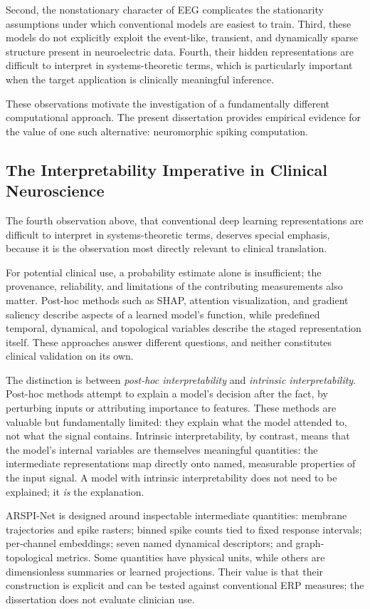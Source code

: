 Second, the nonstationary character of EEG complicates the stationarity assumptions under which conventional models are easiest to train. Third, these models do not explicitly exploit the event-like, transient, and dynamically sparse structure present in neuroelectric data. Fourth, their hidden representations are difficult to interpret in systems-theoretic terms, which is particularly important when the target application is clinically meaningful inference.

These observations motivate the investigation of a fundamentally different computational approach. The present dissertation provides empirical evidence for the value of one such alternative: neuromorphic spiking computation.

\subsection{The Interpretability Imperative in Clinical Neuroscience}

The fourth observation above, that conventional deep learning representations are difficult to interpret in systems-theoretic terms, deserves special emphasis, because it is the observation most directly relevant to clinical translation.

For potential clinical use, a probability estimate alone is insufficient; the provenance, reliability, and limitations of the contributing measurements also matter. Post-hoc methods such as SHAP, attention visualization, and gradient saliency describe aspects of a learned model's function, while predefined temporal, dynamical, and topological variables describe the staged representation itself. These approaches answer different questions, and neither constitutes clinical validation on its own.

The distinction is between \emph{post-hoc interpretability} and \emph{intrinsic interpretability}. Post-hoc methods attempt to explain a model's decision after the fact, by perturbing inputs or attributing importance to features. These methods are valuable but fundamentally limited: they explain what the model attended to, not what the signal contains. Intrinsic interpretability, by contrast, means that the model's internal variables are themselves meaningful quantities: the intermediate representations map directly onto named, measurable properties of the input signal. A model with intrinsic interpretability does not need to be explained; it \emph{is} the explanation.

ARSPI-Net is designed around inspectable intermediate quantities: membrane trajectories and spike rasters; binned spike counts tied to fixed response intervals; per-channel embeddings; seven named dynamical descriptors; and graph-topological metrics. Some quantities have physical units, while others are dimensionless summaries or learned projections. Their value is that their construction is explicit and can be tested against conventional ERP measures; the dissertation does not evaluate clinician use.

